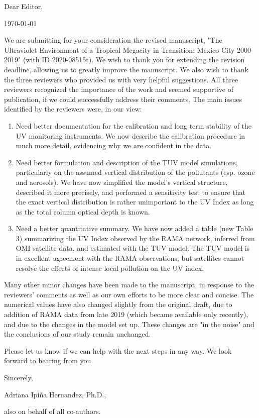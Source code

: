 \documentclass[12pt]{article}
\begin{document}
\begin{minipage}{0.5\linewidth}
    Dear Editor,
\end{minipage}
\begin{minipage}{0.5\linewidth}
    \begin{flushright}
        \today
    \end{flushright}
\end{minipage}

We are submitting for your consideration the revised manuscript, "The Ultraviolet Environment of a Tropical Megacity in Transition: Mexico City 2000-2019" (with ID 2020-08515t).  We wish to thank you for extending the revision deadline, allowing us to greatly improve the manuscript.  We also wish to thank the three reviewers who provided us with very helpful suggestions.  All three reviewers recognized the importance of the work and seemed supportive of publication, if we could successfully address their comments.  The main issues identified by the reviewers were, in our view:
\begin{enumerate}
    \item Need better documentation for the calibration and long term stability of the UV monitoring instruments.  We now describe the calibration procedure in much more detail, evidencing why we are confident in the data.
    \item Need better formulation and description of the TUV model simulations, particularly on the assumed vertical distribution of the pollutants (esp. ozone and aerosols).  We have now simplified the model's vertical structure, described it more precisely, and performed a sensitivity test to ensure that the exact vertical distribution is rather unimportant to the UV Index as long as the total column optical depth is known.
    \item Need a better quantitative summary.  We have now added a table (new Table 3) summarizing the UV Index observed by the RAMA network, inferred from OMI satellite data, and estimated with the TUV model.  The TUV model is in excellent agreement with the RAMA observations, but satellites cannot resolve the effects of intense local pollution on the UV index.
\end{enumerate}
Many other minor changes have been made to the manuscript, in response to the reviewers' comments as well as our own efforts to be more clear and concise.  The numerical values have also changed slightly from the original draft, due to addition of RAMA data from late 2019 (which became available only recently), and due to the changes in the model set up.  These changes are "in the noise" and the conclusions of our study remain unchanged.

Please let us know if we can help with the next steps in any way.  We look forward to hearing from you.

Sincerely,

Adriana Ipiña Hernandez, Ph.D.,

also on behalf of all co-authors.
\end{document}
